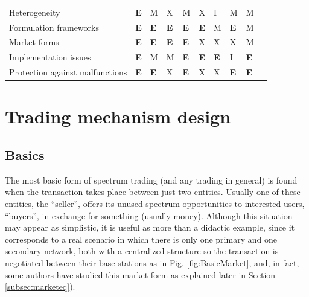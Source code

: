 \begin{landscape}
\begin{table}
\begin{tabular}{p{4.5cm}lllllllll|}
Heterogeneity														&	\textbf{E} 		& M 											& X 														& M 										 & X											 & I 									& M 										& M \\

Formulation frameworks									&	\textbf{E}	  & \textbf{E}							& \textbf{E} 									  & \textbf{E} 						 & \textbf{E}							 & M 									& \textbf{E} 						& M \\

Market forms														&	\textbf{E} 		& \textbf{E} 							& \textbf{E} 										& \textbf{E} 						 & X											 & X 									& X 										& M \\

Implementation issues										&	\textbf{E} 		& M 											& M 														& \textbf{E} 						 & \textbf{E}							 & \textbf{E} 				& I 										& \textbf{E} \\

Protection against malfunctions					&	\textbf{E} 		& \textbf{E} 							& X 														& \textbf{E} 						 & X											 & X 									& \textbf{E} 						& \textbf{E} \\
\hline				
\end{tabular}
\end{table}
\end{landscape}

\section{Trading mechanism design} 
\label{sec:Trading}
\subsection{Basics} 
\label{subsec:When}
The most basic form of spectrum trading (and any trading in general) is found when the transaction takes place between just two entities. Usually one of these entities, the ``seller'', offers its unused spectrum opportunities to interested users, ``buyers'', in exchange for something (usually money). Although this situation may appear as simplistic, it is useful as more than a didactic example, since it corresponds to a real scenario in which there is only one primary and one secondary network, both with a centralized structure so the transaction is negotiated between their base stations as in Fig. \ref{fig:BasicMarket}, and, in fact, some authors have studied this market form as explained later in Section \ref{subsec:marketeq}). 

